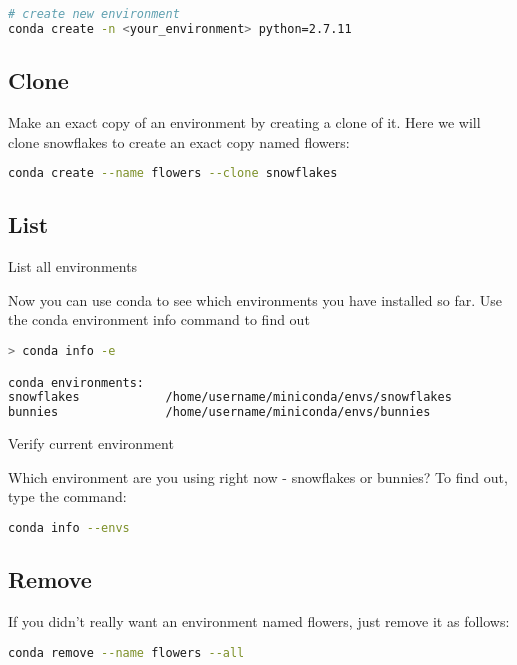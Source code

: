 \begin{lstlisting}[language=Bash]
# create new environment
conda create -n <your_environment> python=2.7.11
\end{lstlisting}

\subsection{Clone}

Make an exact copy of an environment by creating a clone of it. Here we will clone snowflakes to create an exact copy named flowers:

\begin{lstlisting}[language=bash]
conda create --name flowers --clone snowflakes
\end{lstlisting}

\subsection{List}

List all environments

Now you can use conda to see which environments you have installed so far. Use the conda environment info command to find out

\begin{lstlisting}[language=bash]
> conda info -e

conda environments:
snowflakes            /home/username/miniconda/envs/snowflakes
bunnies               /home/username/miniconda/envs/bunnies
\end{lstlisting}

Verify current environment

Which environment are you using right now - snowflakes or bunnies? To find out, type the command:

\begin{lstlisting}[language=bash]
conda info --envs
\end{lstlisting}


\subsection{Remove}

If you didn't really want an environment named flowers, just remove it as follows:


\begin{lstlisting}[language=bash]
conda remove --name flowers --all
\end{lstlisting}

